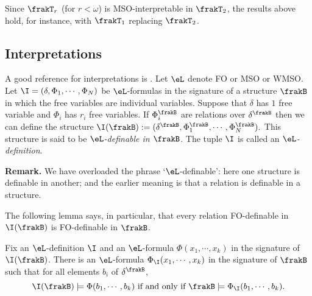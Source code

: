 
\begin{remark}
Since $\frakT_r$ (for $r < \omega$) is MSO-interpretable in $\frakT_2$, the results above hold, for instance, with $\frakT_1$ replacing $\frakT_2$.
\end{remark}

\subsection{Interpretations}

A good reference for interpretations is \cite{Hodg93}.
Let $\eL$ denote FO or MSO or WMSO. Let  $\I = (\delta, \Phi_1, \cdots, \Phi_N)$ be $\eL$-formulas in the signature of a structure $\frakB$ in 
which the free variables are individual variables.
Suppose that $\delta$ has $1$ free variable and $\Phi_i$ has $r_i$ free variables.
If $\Phi_i^\frakB$ are relations over $\delta^\frakB$ then we can define the structure 
$\I(\frakB) := (\delta^\frakB, \Phi_1^\frakB, \cdots, \Phi_N^\frakB).$ 
This structure is said to be {\em $\eL$-definable in $\frakB$}. The tuple $\I$ is called an {\em $\eL$-definition}.

{\bf Remark.} We have overloaded the phrase `$\eL$-definable': here one structure is definable in another; 
and the earlier meaning is that a relation is definable in a structure.

The following lemma says, in particular, that every relation FO-definable in $\I(\frakB)$ is 
FO-definable in $\frakB$.

\begin{lemma} \label{AS:lem:translation} 
Fix an $\eL$-definition $\I$ and an $\eL$-formula $\Phi(x_1,\cdots,x_k)$ in the signature of $\I(\frakB)$.
There is an $\eL$-formula $\Phi_\I(x_1,\cdots,x_k)$ in the signature of $\frakB$ such that for all elements $b_i$ of $\delta^\frakB$,
\[
\I(\frakB) \models \Phi(b_1,\cdots,b_k) \mbox{ if and only if } \frakB \models \Phi_\I(b_1,\cdots,b_k).
\]
\end{lemma}

